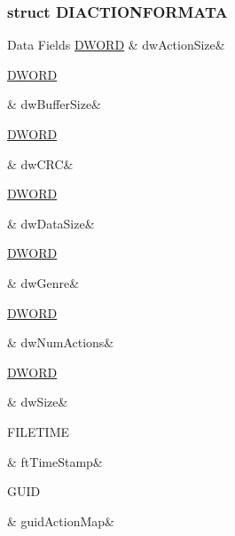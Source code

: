 \subsubsection{struct D\-I\-A\-C\-T\-I\-O\-N\-F\-O\-R\-M\-A\-T\-A}
\begin{DoxyFields}{Data Fields}
\hypertarget{a00003_ae15443760fb1e56392d47da22bd9d103}{\hyperlink{a00003_a50e15ae51c87ae06ab29c8148cb5f36c}{D\-W\-O\-R\-D}}\label{a00003_ae15443760fb1e56392d47da22bd9d103}
&
dw\-Action\-Size&
\\
\hline

\hypertarget{a00003_a92761eecb6910f4a437a95dd14171e93}{\hyperlink{a00003_a50e15ae51c87ae06ab29c8148cb5f36c}{D\-W\-O\-R\-D}}\label{a00003_a92761eecb6910f4a437a95dd14171e93}
&
dw\-Buffer\-Size&
\\
\hline

\hypertarget{a00003_ae4dd9dc42f5e54b0d46f4fdd0a8bde8c}{\hyperlink{a00003_a50e15ae51c87ae06ab29c8148cb5f36c}{D\-W\-O\-R\-D}}\label{a00003_ae4dd9dc42f5e54b0d46f4fdd0a8bde8c}
&
dw\-C\-R\-C&
\\
\hline

\hypertarget{a00003_a6599e7e2ac8527227e1b25a7cf171709}{\hyperlink{a00003_a50e15ae51c87ae06ab29c8148cb5f36c}{D\-W\-O\-R\-D}}\label{a00003_a6599e7e2ac8527227e1b25a7cf171709}
&
dw\-Data\-Size&
\\
\hline

\hypertarget{a00003_a7f25e1451e47f306ba2f7b4df8a98cb7}{\hyperlink{a00003_a50e15ae51c87ae06ab29c8148cb5f36c}{D\-W\-O\-R\-D}}\label{a00003_a7f25e1451e47f306ba2f7b4df8a98cb7}
&
dw\-Genre&
\\
\hline

\hypertarget{a00003_ab3c72dc33adb40eb012766701fb54b26}{\hyperlink{a00003_a50e15ae51c87ae06ab29c8148cb5f36c}{D\-W\-O\-R\-D}}\label{a00003_ab3c72dc33adb40eb012766701fb54b26}
&
dw\-Num\-Actions&
\\
\hline

\hypertarget{a00003_a669c5a85f5a9eb97e64ad880fadaaa2d}{\hyperlink{a00003_a50e15ae51c87ae06ab29c8148cb5f36c}{D\-W\-O\-R\-D}}\label{a00003_a669c5a85f5a9eb97e64ad880fadaaa2d}
&
dw\-Size&
\\
\hline

\hypertarget{a00003_a29b28c447c8479ccca5479fe86ffddc8}{F\-I\-L\-E\-T\-I\-M\-E}\label{a00003_a29b28c447c8479ccca5479fe86ffddc8}
&
ft\-Time\-Stamp&
\\
\hline

\hypertarget{a00003_ac580279a42dedf4f7b6ad1abed891f6e}{G\-U\-I\-D}\label{a00003_ac580279a42dedf4f7b6ad1abed891f6e}
&
guid\-Action\-Map&
\\
\hline


\end{DoxyFields}
